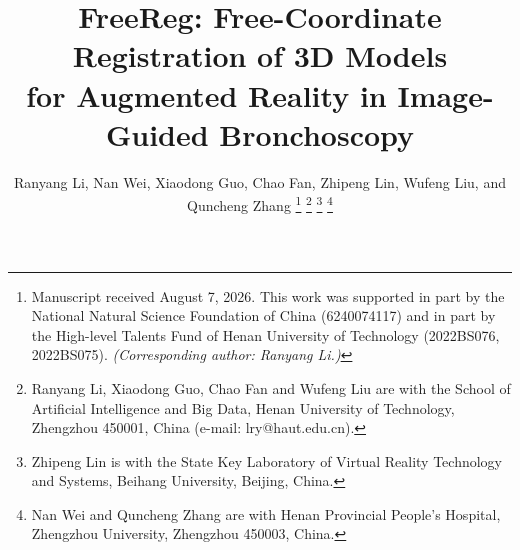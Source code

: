 \documentclass[9pt,twoside,web]{ieeecolor2}
\begin{document}
\title{FreeReg: Free-Coordinate Registration of 3D Models\\for Augmented Reality in Image-Guided Bronchoscopy}

\author{Ranyang Li, Nan Wei, Xiaodong Guo, Chao Fan, Zhipeng Lin, Wufeng Liu, and Quncheng Zhang
\thanks{Manuscript received August 7, 2026. This work was supported in part by the National Natural Science Foundation of China (6240074117) and in part by the High-level Talents Fund of Henan University of Technology (2022BS076, 2022BS075). \emph{(Corresponding author: Ranyang Li.)}}
\thanks{Ranyang Li, Xiaodong Guo, Chao Fan and Wufeng Liu are with the School of Artificial Intelligence and Big Data, Henan University of Technology, Zhengzhou 450001, China (e-mail: lry@haut.edu.cn).}
\thanks{Zhipeng Lin is with the State Key Laboratory of Virtual Reality Technology and Systems, Beihang University, Beijing, China.}
\thanks{Nan Wei and Quncheng Zhang are with Henan Provincial People's Hospital, Zhengzhou University, Zhengzhou 450003, China.}
}

\maketitle
\end{document}
